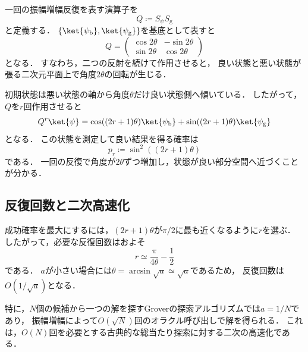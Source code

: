 一回の振幅増幅反復を表す演算子を
\begin{equation}
  Q
  \coloneq
  S_{\psi}S_{\mathrm{g}}
  \label{eq:amplitude-amplification-operator}
\end{equation}
と定義する．
$\{\ket{\psi_{\mathrm{b}}},\ket{\psi_{\mathrm{g}}}\}$を基底として表すと
\begin{equation}
  Q
  =
  \begin{pmatrix}
    \cos 2\theta & -\sin 2\theta\\
    \sin 2\theta & \cos 2\theta
  \end{pmatrix}
  \label{eq:amplitude-amplification-rotation-matrix}
\end{equation}
となる．
すなわち，二つの反射を続けて作用させると，
良い状態と悪い状態が張る二次元平面上で角度$2\theta$の回転が生じる\cite{shimada2020}．

初期状態は悪い状態の軸から角度$\theta$だけ良い状態側へ傾いている．
したがって，$Q$を$r$回作用させると
\begin{equation}
  Q^r\ket{\psi}
  =
  \cos((2r+1)\theta)\ket{\psi_{\mathrm{b}}}
  +\sin((2r+1)\theta)\ket{\psi_{\mathrm{g}}}
  \label{eq:amplitude-after-r-iterations}
\end{equation}
となる．
この状態を測定して良い結果を得る確率は
\begin{equation}
  p_r
  \coloneq
  \sin^2((2r+1)\theta)
  \label{eq:amplified-success-probability}
\end{equation}
である．
一回の反復で角度が$2\theta$ずつ増加し，状態が良い部分空間へ近づくことが分かる．

\subsection{反復回数と二次高速化}
\label{subsec:amplification-iteration-count}

成功確率を最大にするには，$(2r+1)\theta$が$\pi/2$に最も近くなるように$r$を選ぶ．
したがって，必要な反復回数はおよそ
\begin{equation}
  r
  \simeq
  \frac{\pi}{4\theta}-\frac{1}{2}
  \label{eq:near-optimal-amplification-count}
\end{equation}
である．
$a$が小さい場合には$\theta=\arcsin\sqrt{a}\simeq\sqrt{a}$であるため，
反復回数は$O(1/\sqrt{a})$となる．

特に，$N$個の候補から一つの解を探すGroverの探索アルゴリズムでは$a=1/N$であり，
振幅増幅によって$O(\sqrt{N})$回のオラクル呼び出しで解を得られる\cite{grover1996}．
これは，$O(N)$回を必要とする古典的な総当たり探索に対する二次の高速化である．

